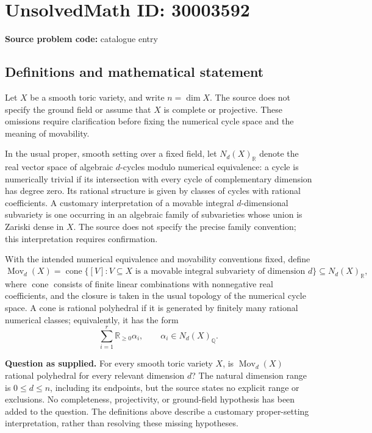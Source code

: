 \documentclass[11pt]{article}
\newcommand{\Q}{\mathbb{Q}}
\newcommand{\R}{\mathbb{R}}
\begin{document}
\section*{UnsolvedMath ID: 30003592}
\textbf{Source problem code:} catalogue entry
\subsection{Definitions and mathematical statement}
Let \(X\) be a smooth toric variety, and write \(n=\dim X\). The source does not specify the ground field or assume that \(X\) is complete or projective. These omissions require clarification before fixing the numerical cycle space and the meaning of movability.

In the usual proper, smooth setting over a fixed field, let \(N_d(X)_{\R}\) denote the real vector space of algebraic \(d\)-cycles modulo numerical equivalence: a cycle is numerically trivial if its intersection with every cycle of complementary dimension has degree zero. Its rational structure is given by classes of cycles with rational coefficients. A customary interpretation of a movable integral \(d\)-dimensional subvariety is one occurring in an algebraic family of subvarieties whose union is Zariski dense in \(X\). The source does not specify the precise family convention; this interpretation requires confirmation.

With the intended numerical equivalence and movability conventions fixed, define
\[
\operatorname{Mov}_d(X)
=
\overline{\operatorname{cone}\bigl\{[V]: V\subseteq X\text{ is a movable integral subvariety of dimension }d\bigr\}}
\subseteq N_d(X)_{\R},
\]
where \(\operatorname{cone}\) consists of finite linear combinations with nonnegative real coefficients, and the closure is taken in the usual topology of the numerical cycle space. A cone is rational polyhedral if it is generated by finitely many rational numerical classes; equivalently, it has the form
\[
\sum_{i=1}^{r}\R_{\geq 0}\alpha_i,
\qquad \alpha_i\in N_d(X)_{\Q}.
\]

\textbf{Question as supplied.} For every smooth toric variety \(X\), is \(\operatorname{Mov}_d(X)\) rational polyhedral for every relevant dimension \(d\)? The natural dimension range is \(0\leq d\leq n\), including its endpoints, but the source states no explicit range or exclusions. No completeness, projectivity, or ground-field hypothesis has been added to the question. The definitions above describe a customary proper-setting interpretation, rather than resolving these missing hypotheses.
\end{document}
